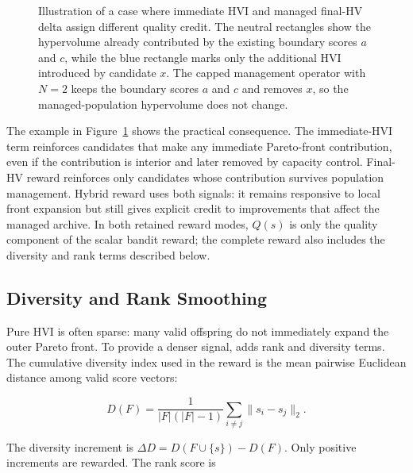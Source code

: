 \begin{figure}[H]
\begin{minipage}{0.49\linewidth}
  \end{minipage}
  \caption{Illustration of a case where immediate HVI and managed final-HV delta assign different quality credit. The neutral rectangles show the hypervolume already contributed by the existing boundary scores $a$ and $c$, while the blue rectangle marks only the additional HVI introduced by candidate $x$. The capped management operator with $N=2$ keeps the boundary scores $a$ and $c$ and removes $x$, so the managed-population hypervolume does not change.}
  \label{fig:immediate-final-reward-example}
\end{figure}

The example in Figure~\ref{fig:immediate-final-reward-example} shows the practical consequence. The immediate-HVI term reinforces candidates that make any immediate Pareto-front contribution, even if the contribution is interior and later removed by capacity control. Final-HV reward reinforces only candidates whose contribution survives population management. Hybrid reward uses both signals: it remains responsive to local front expansion but still gives explicit credit to improvements that affect the managed archive. In both retained reward modes, $Q(s)$ is only the quality component of the scalar bandit reward; the complete reward also includes the diversity and rank terms described below.

\subsection{Diversity and Rank Smoothing}

Pure HVI is often sparse: many valid offspring do not immediately expand the outer Pareto front. To provide a denser signal, \bmab{} adds rank and diversity terms. The cumulative diversity index used in the reward is the mean pairwise Euclidean distance among valid score vectors:

\begin{equation}
  D(F)
  =
  \frac{1}{|F|(|F|-1)}
  \sum_{i \ne j} \|s_i-s_j\|_2.
\end{equation}

The diversity increment is $\Delta D = D(F\cup\{s\})-D(F)$. Only positive increments are rewarded. The rank score is

